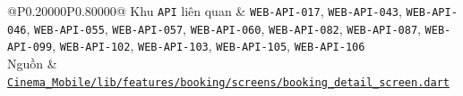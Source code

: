 \begin{longtable}{@{}P{0.20000\SRSWidth}P{0.80000\SRSWidth}@{}}
Khu \texttt{API} liên quan & \texttt{WEB-\allowbreak{}API-\allowbreak{}017}, \texttt{WEB-\allowbreak{}API-\allowbreak{}043}, \texttt{WEB-\allowbreak{}API-\allowbreak{}046}, \texttt{WEB-\allowbreak{}API-\allowbreak{}055}, \texttt{WEB-\allowbreak{}API-\allowbreak{}057}, \texttt{WEB-\allowbreak{}API-\allowbreak{}060}, \texttt{WEB-\allowbreak{}API-\allowbreak{}082}, \texttt{WEB-\allowbreak{}API-\allowbreak{}087}, \texttt{WEB-\allowbreak{}API-\allowbreak{}099}, \texttt{WEB-\allowbreak{}API-\allowbreak{}102}, \texttt{WEB-\allowbreak{}API-\allowbreak{}103}, \texttt{WEB-\allowbreak{}API-\allowbreak{}105}, \texttt{WEB-\allowbreak{}API-\allowbreak{}106} \\[3pt]
Nguồn & \href{../../../Cinema\_Mobile/lib/features/booking/screens/booking\_detail\_screen.dart}{\texttt{Cinema\_\allowbreak{}Mobile/\allowbreak{}lib/\allowbreak{}features\allowbreak{}/\allowbreak{}booking/\allowbreak{}screens/\allowbreak{}booking\_\allowbreak{}detail\_\allowbreak{}screen.\allowbreak{}dart}} \\[3pt]
\end{longtable}
\endgroup

